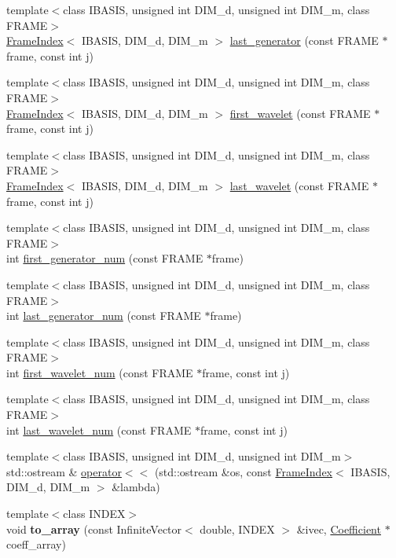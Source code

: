 \begin{CompactItemize}
\item 
{\footnotesize template$<$class IBASIS, unsigned int DIM\_\-d, unsigned int DIM\_\-m, class FRAME$>$ }\\\hyperlink{classFrameTL_1_1FrameIndex}{FrameIndex}$<$ IBASIS, DIM\_\-d, DIM\_\-m $>$ \hyperlink{namespaceFrameTL_a6650ac9337756c12f5022699c50cc28}{last\_\-generator} (const FRAME $\ast$frame, const int j)
\item 
{\footnotesize template$<$class IBASIS, unsigned int DIM\_\-d, unsigned int DIM\_\-m, class FRAME$>$ }\\\hyperlink{classFrameTL_1_1FrameIndex}{FrameIndex}$<$ IBASIS, DIM\_\-d, DIM\_\-m $>$ \hyperlink{namespaceFrameTL_ad2c37c6767c23fca5c2c3e1563680a5}{first\_\-wavelet} (const FRAME $\ast$frame, const int j)
\item 
{\footnotesize template$<$class IBASIS, unsigned int DIM\_\-d, unsigned int DIM\_\-m, class FRAME$>$ }\\\hyperlink{classFrameTL_1_1FrameIndex}{FrameIndex}$<$ IBASIS, DIM\_\-d, DIM\_\-m $>$ \hyperlink{namespaceFrameTL_7c29f890e91e2cd966b9ac6b773277cf}{last\_\-wavelet} (const FRAME $\ast$frame, const int j)
\item 
{\footnotesize template$<$class IBASIS, unsigned int DIM\_\-d, unsigned int DIM\_\-m, class FRAME$>$ }\\int \hyperlink{namespaceFrameTL_80cab15b10b2b3bff9e29f51409f7ce7}{first\_\-generator\_\-num} (const FRAME $\ast$frame)
\item 
{\footnotesize template$<$class IBASIS, unsigned int DIM\_\-d, unsigned int DIM\_\-m, class FRAME$>$ }\\int \hyperlink{namespaceFrameTL_0544af1a279910dc8bcdb9b542df3166}{last\_\-generator\_\-num} (const FRAME $\ast$frame)
\item 
{\footnotesize template$<$class IBASIS, unsigned int DIM\_\-d, unsigned int DIM\_\-m, class FRAME$>$ }\\int \hyperlink{namespaceFrameTL_d2a45d507a64c17ff1cf1edeb7afcd8e}{first\_\-wavelet\_\-num} (const FRAME $\ast$frame, const int j)
\item 
{\footnotesize template$<$class IBASIS, unsigned int DIM\_\-d, unsigned int DIM\_\-m, class FRAME$>$ }\\int \hyperlink{namespaceFrameTL_98345f161b05ac9604fbd9070da0bba7}{last\_\-wavelet\_\-num} (const FRAME $\ast$frame, const int j)
\item 
{\footnotesize template$<$class IBASIS, unsigned int DIM\_\-d, unsigned int DIM\_\-m$>$ }\\std::ostream \& \hyperlink{namespaceFrameTL_4f787a15e5a101207d222e0a799a7e5d}{operator$<$$<$} (std::ostream \&os, const \hyperlink{classFrameTL_1_1FrameIndex}{FrameIndex}$<$ IBASIS, DIM\_\-d, DIM\_\-m $>$ \&lambda)
\item 
\hypertarget{namespaceFrameTL_80a56eff444cfd2880b83403ab09e808}{
{\footnotesize template$<$class INDEX$>$ }\\void \textbf{to\_\-array} (const InfiniteVector$<$ double, INDEX $>$ \&ivec, \hyperlink{structFrameTL_1_1Coefficient}{Coefficient} $\ast$coeff\_\-array)}
\label{namespaceFrameTL_80a56eff444cfd2880b83403ab09e808}


\end{CompactItemize}
